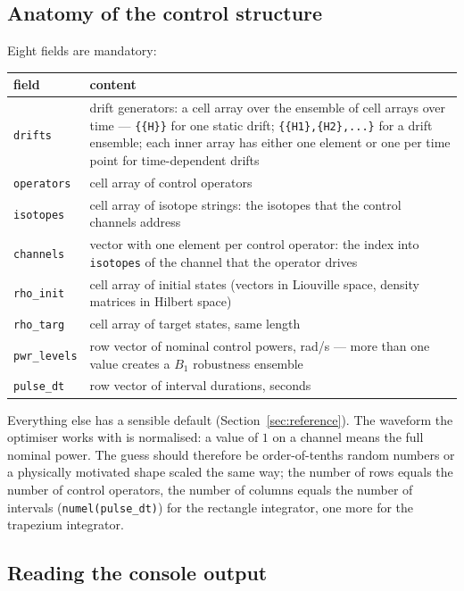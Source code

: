 \documentclass[11pt,a4paper]{article}
\newcommand{\code}[1]{\texttt{#1}}
\begin{document}
\subsection{Anatomy of the control structure}

Eight fields are mandatory:
\begin{center}
\begin{tabular}{lp{9.5cm}}
\toprule
field & content \\
\midrule
\code{drifts} & drift generators: a cell array over the ensemble of cell
arrays over time --- \code{\{\{H\}\}} for one static drift;
\code{\{\{H1\},\{H2\},...\}} for a drift ensemble; each inner array has
either one element or one per time point for time-dependent drifts\\
\code{operators} & cell array of control operators\\
\code{isotopes} & cell array of isotope strings: the isotopes that the
control channels address\\
\code{channels} & vector with one element per control operator: the
index into \code{isotopes} of the channel that the operator drives\\
\code{rho\_init} & cell array of initial states (vectors in Liouville
space, density matrices in Hilbert space)\\
\code{rho\_targ} & cell array of target states, same length\\
\code{pwr\_levels} & row vector of nominal control powers, rad/s ---
more than one value creates a $B_1$ robustness ensemble\\
\code{pulse\_dt} & row vector of interval durations, seconds\\
\bottomrule
\end{tabular}
\end{center}
Everything else has a sensible default (Section~\ref{sec:reference}).
The waveform the optimiser works with is normalised: a value of $1$ on a
channel means the full nominal power. The guess should therefore be
order-of-tenths random numbers or a physically motivated shape scaled the
same way; the number of rows equals the number of control operators, the
number of columns equals the number of intervals
(\code{numel(pulse\_dt)}) for the rectangle integrator, one more for the
trapezium integrator.

\subsection{Reading the console output}
\end{document}
